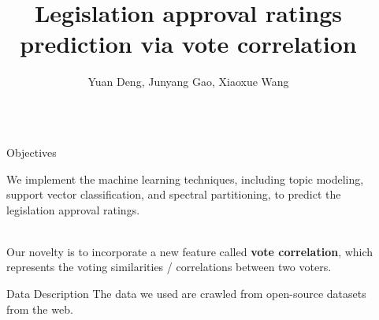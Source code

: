 \documentclass[final]{beamer}
\title{Legislation approval ratings prediction via vote correlation} %
\author{Yuan Deng, Junyang Gao, Xiaoxue Wang} %
\institute{Computer Science Department, Duke University} %
\newlength{\sepwid}
\newlength{\onecolwid}
\begin{document}

\setlength{\belowcaptionskip}{2ex} %
\setlength\belowdisplayshortskip{2ex} %

\begin{frame}[t] %

\begin{columns}[t] %

\begin{column}{\sepwid}\end{column} %

\begin{column}{\onecolwid} %


\begin{alertblock}{Objectives}

We implement the machine learning techniques, including topic modeling, support vector classification, and spectral partitioning, to predict the legislation approval ratings. 

\quad \\

Our novelty is to incorporate a new feature called \textbf{vote correlation}, which represents the voting similarities / correlations between two voters. 

\end{alertblock}


\begin{block}{Data Description}
     The data we used are crawled from open-source datasets from the web. %
     
     \quad \\
     

\end{block}
\end{column}
\end{columns}
\end{frame}
\end{document}
